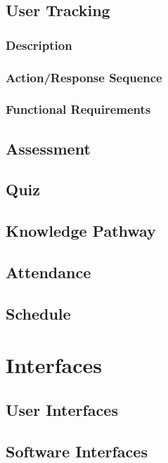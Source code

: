 \subsection{User Tracking}

\subsubsection{Description}

\subsubsection{Action/Response Sequence}

\subsubsection{Functional Requirements}

\subsection{Assessment}

\subsection{Quiz}

\subsection{Knowledge Pathway}

\subsection{Attendance}

\subsection{Schedule}

\section{Interfaces}

\subsection{User Interfaces}

\subsection{Software Interfaces}

